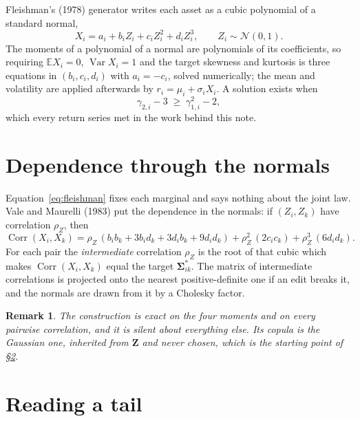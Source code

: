 \documentclass[11pt]{article}
\newtheorem{remark}{Remark}
\DeclareMathOperator{\Var}{Var}
\DeclareMathOperator{\Corr}{Corr}
\newcommand{\bSigma}{\boldsymbol\Sigma}
\begin{document}
Fleishman's (1978) generator writes each asset as a cubic polynomial of a
standard normal,
\begin{equation}\label{eq:fleishman}
  X_i = a_i + b_i Z_i + c_i Z_i^2 + d_i Z_i^3, \qquad Z_i \sim \mathcal N(0, 1).
\end{equation}
The moments of a polynomial of a normal are polynomials of its coefficients,
so requiring $\mathbb E X_i = 0$, $\Var X_i = 1$ and the target skewness and
kurtosis is three equations in $(b_i, c_i, d_i)$ with $a_i = -c_i$, solved
numerically; the mean and volatility are applied afterwards by
$r_i = \mu_i + \sigma_i X_i$. A solution exists when
\begin{equation}\label{eq:fleishman_feasible}
  \gamma_{2,i} - 3 \;\ge\; \gamma_{1,i}^2 - 2 ,
\end{equation}
which every return series met in the work behind this note.

\section{Dependence through the normals}\label{sec:vm}

Equation~\eqref{eq:fleishman} fixes each marginal and says nothing about the
joint law. Vale and Maurelli (1983) put the dependence in the normals: if
$(Z_i, Z_k)$ have correlation $\rho_Z$, then
\begin{equation}\label{eq:vm}
  \Corr(X_i, X_k) = \rho_Z \,(b_i b_k + 3 b_i d_k + 3 d_i b_k + 9 d_i d_k)
   + \rho_Z^2\, (2 c_i c_k) + \rho_Z^3\, (6 d_i d_k) .
\end{equation}
For each pair the \emph{intermediate} correlation $\rho_Z$ is the root of that
cubic which makes $\Corr(X_i, X_k)$ equal the target $\bSigma^*_{ik}$. The
matrix of intermediate correlations is projected onto the nearest
positive-definite one if an edit breaks it, and the normals are drawn from it
by a Cholesky factor.

\begin{remark}
The construction is exact on the four moments and on every pairwise
correlation, and it is silent about everything else. Its copula is the
Gaussian one, inherited from $\mathbf Z$ and never chosen, which is the
starting point of \S\ref{sec:tails}.
\end{remark}

\section{Reading a tail}\label{sec:tails}
\end{document}
